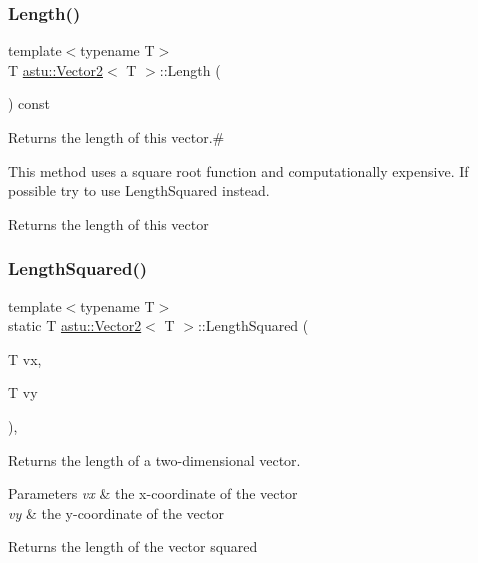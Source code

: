 \subsubsection{\texorpdfstring{Length()}{Length()}\hspace{0.1cm}{\footnotesize\ttfamily [2/2]}}
{\footnotesize\ttfamily template$<$typename T$>$ \\
T \hyperlink{classastu_1_1Vector2}{astu\+::\+Vector2}$<$ T $>$\+::Length (\begin{DoxyParamCaption}{ }\end{DoxyParamCaption}) const\hspace{0.3cm}{\ttfamily [inline]}}

Returns the length of this vector.\#

This method uses a square root function and computationally expensive. If possible try to use {\ttfamily Length\+Squared} instead.

\begin{DoxyReturn}{Returns}
the length of this vector 
\end{DoxyReturn}
\mbox{\label{classastu_1_1Vector2_afbc3ba40ff99e66abbe5db6b5adb6b97}} 
\subsubsection{\texorpdfstring{Length\+Squared()}{LengthSquared()}\hspace{0.1cm}{\footnotesize\ttfamily [1/2]}}
{\footnotesize\ttfamily template$<$typename T$>$ \\
static T \hyperlink{classastu_1_1Vector2}{astu\+::\+Vector2}$<$ T $>$\+::Length\+Squared (\begin{DoxyParamCaption}\item[{T}]{vx,  }\item[{T}]{vy }\end{DoxyParamCaption})\hspace{0.3cm}{\ttfamily [inline]}, {\ttfamily [static]}}

Returns the length of a two-\/dimensional vector.


\begin{DoxyParams}{Parameters}
{\em vx} & the x-\/coordinate of the vector \\
\hline
{\em vy} & the y-\/coordinate of the vector \\
\hline
\end{DoxyParams}
\begin{DoxyReturn}{Returns}
the length of the vector squared 
\end{DoxyReturn}
\mbox{\label{classastu_1_1Vector2_a42ff8efbc4747ec1042867e30e565311}} 

